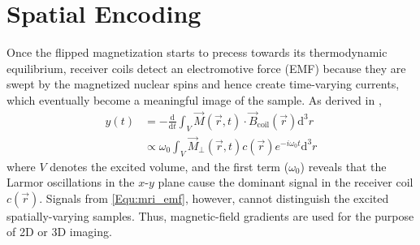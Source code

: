 \section{Spatial Encoding} \label{Sec:mri-signal-detect}
Once the flipped magnetization starts to precess towards its thermodynamic equilibrium, receiver coils detect an electromotive force (EMF) because they are swept by the magnetized nuclear spins and hence create time-varying currents, which eventually become a meaningful image of the sample. As derived in \cite{1999_MRI},
\begin{align} 
  y(t)  &= -\frac{\text{d}}{\text{d}t} \int_{V} \vec{M} (\vec{r},t) \cdot \vec{B}_{\text{coil}} (\vec{r}) \text{d}^{3} r \nonumber \\
  &\propto \omega_0 \int_{V} \vec{M}_{\perp} (\vec{r},t) c(\vec{r}) e^{- i \omega_0 t} \text{d}^{3} r \label{Equ:mri_emf}
\end{align}
where $V$ denotes the excited volume, and the first term ($\omega_0$) reveals that the Larmor oscillations in the $x$-$y$ plane cause the dominant signal in the receiver coil $c(\vec{r})$. Signals from \cref{Equ:mri_emf}, however, cannot distinguish the excited spatially-varying samples. Thus, magnetic-field gradients are used for the purpose of 2D or 3D imaging. 

